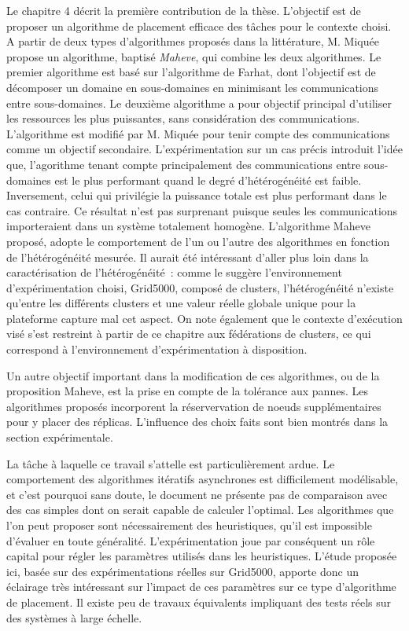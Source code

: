 \documentclass[a4paper,12pt]{article}
\begin{document}
Le chapitre 4 décrit la première contribution de la thèse. L'objectif
est de proposer un algorithme de placement efficace des tâches pour le
contexte choisi. A partir de deux types d'algorithmes proposés dans la 
littérature, M. Miquée propose un algorithme, baptisé \textit{Maheve}, 
qui combine les deux algorithmes. Le premier algorithme est basé sur 
l'algorithme de Farhat, dont l'objectif est de décomposer un domaine en 
sous-domaines en minimisant les communications entre sous-domaines. Le 
deuxième algorithme a pour objectif principal d'utiliser les ressources 
les plus puissantes, sans considération des communications. L'algorithme
est modifié par M. Miquée pour tenir compte des communications comme
un objectif secondaire. L'expérimentation sur un cas précis introduit
l'idée que, l'agorithme tenant compte principalement des communications
entre sous-domaines est le plus performant quand le degré d'hétérogénéité
est faible. Inversement, celui qui privilégie la puissance totale est plus
performant dans le cas contraire. Ce résultat n'est pas surprenant puisque 
seules les communications importeraient dans un système totalement homogène. 
L'algorithme Maheve proposé, adopte le comportement de l'un ou l'autre des 
algorithmes en fonction de l'hétérogénéité mesurée.
Il aurait été intéressant d'aller plus loin dans la caractérisation
de l'hétérogénéité~: comme le suggère l'environnement d'expérimentation
choisi, Grid5000, composé de clusters, l'hétérogénéité n'existe qu'entre 
les différents clusters et une valeur réelle globale unique pour 
la plateforme capture mal cet aspect. On note également que le contexte 
d'exécution visé s'est restreint à partir de ce chapitre aux fédérations de 
clusters, ce qui correspond à l'environnement d'expérimentation à
disposition.

Un autre objectif important dans la modification de ces algorithmes, ou de 
la proposition Maheve, est la prise en compte de la tolérance aux pannes.
Les algorithmes proposés incorporent la réservervation de noeuds supplémentaires
pour y placer des réplicas. L'influence des choix faits sont bien montrés dans
la section expérimentale.

La tâche à laquelle ce travail s'attelle est particulièrement ardue.
Le comportement des algorithmes itératifs asynchrones est difficilement 
modélisable, et c'est pourquoi sans doute, le document ne présente pas
de comparaison avec des cas simples dont on serait capable de calculer 
l'optimal. Les algorithmes que l'on peut proposer sont nécessairement des 
heuristiques, qu'il est impossible d'évaluer en toute généralité. 
L'expérimentation joue par conséquent un rôle capital pour régler les paramètres 
utilisés dans les heuristiques. L'étude proposée ici, basée sur des expérimentations
réelles sur Grid5000, apporte donc un éclairage très intéressant sur l'impact 
de ces paramètres sur ce type d'algorithme de placement. Il existe peu de 
travaux équivalents impliquant des tests réels sur des systèmes à large échelle.
\end{document}

